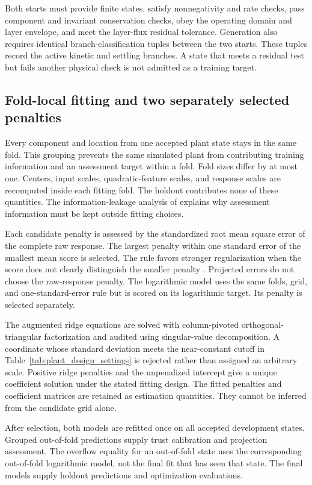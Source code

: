 Both starts must provide finite states, satisfy nonnegativity and rate checks, pass component and invariant conservation checks, obey the operating domain and layer envelope, and meet the layer-flux residual tolerance. Generation also requires identical branch-classification tuples between the two starts. These tuples record the active kinetic and settling branches. A state that meets a residual test but fails another physical check is not admitted as a training target.

\subsection{Fold-local fitting and two separately selected penalties}

Every component and location from one accepted plant state stays in the same fold. This grouping prevents the same simulated plant from contributing training information and an assessment target within a fold. Fold sizes differ by at most one. Centers, input scales, quadratic-feature scales, and response scales are recomputed inside each fitting fold. The holdout contributes none of these quantities. The information-leakage analysis of \citet{Kaufman2012} explains why assessment information must be kept outside fitting choices.

Each candidate penalty is assessed by the standardized root mean square error of the complete raw response. The largest penalty within one standard error of the smallest mean score is selected. The rule favors stronger regularization when the score does not clearly distinguish the smaller penalty \citep{Hastie2009}. Projected errors do not choose the raw-response penalty. The logarithmic model uses the same folds, grid, and one-standard-error rule but is scored on its logarithmic target. Its penalty is selected separately.

The augmented ridge equations are solved with column-pivoted orthogonal-triangular factorization and audited using singular-value decomposition. A coordinate whose standard deviation meets the near-constant cutoff in Table~\ref{tab:plant_design_settings} is rejected rather than assigned an arbitrary scale. Positive ridge penalties and the unpenalized intercept give a unique coefficient solution under the stated fitting design. The fitted penalties and coefficient matrices are retained as estimation quantities. They cannot be inferred from the candidate grid alone.

After selection, both models are refitted once on all accepted development states. Grouped out-of-fold predictions supply trust calibration and projection assessment. The overflow equality for an out-of-fold state uses the corresponding out-of-fold logarithmic model, not the final fit that has seen that state. The final models supply holdout predictions and optimization evaluations.

